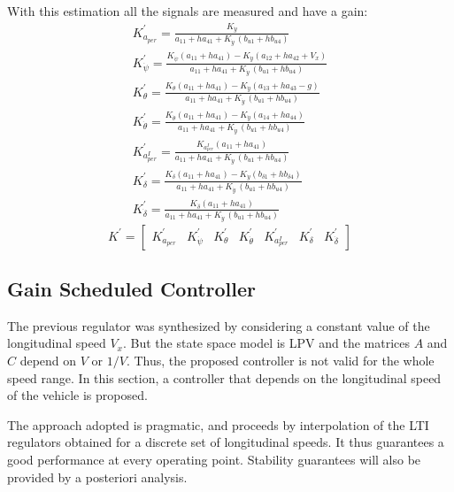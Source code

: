 With this estimation all the signals are measured and have a gain:
\begin{eqnarray}
K_{a_{per}}^{'}=\frac{K_{\dot{y}}}{a_{11}+ha_{41}+K_{\dot{y}}\,(b_{u1}+hb_{u4})} \\[10pt]
K_{\dot{\psi}}^{'}=\frac{K_{\dot{\psi}}(a_{11}+ha_{41})-K_{\dot{y}}(a_{12}+ha_{42}+V_{x})}{a_{11}+ha_{41}+K_{\dot{y}}\,(b_{u1}+hb_{u4})} \\[10pt]
K_{\theta}^{'}=\frac{K_{\theta}(a_{11}+ha_{41})-K_{\dot{y}}(a_{13}+ha_{43}-g)}{a_{11}+ha_{41}+K_{\dot{y}}\,(b_{u1}+hb_{u4})} \\[10pt]
K_{\dot{\theta}}^{'}=\frac{K_{\dot{\theta}}(a_{11}+ha_{41})-K_{\dot{y}}(a_{14}+ha_{44})}{a_{11}+ha_{41}+K_{\dot{y}}\,(b_{u1}+hb_{u4})} \\[10pt]
K_{a_{per}^{I}}^{'}=\frac{K_{a_{per}^{I}}(a_{11}+ha_{41})}{a_{11}+ha_{41}+K_{\dot{y}}\,(b_{u1}+hb_{u4})} \\[10pt]
K_{\delta}^{'}=\frac{K_{\delta}(a_{11}+ha_{41})-K_{\dot{y}}(b_{\delta 1}+hb_{\delta 4})}{a_{11}+ha_{41}+K_{\dot{y}}\,(b_{u1}+hb_{u4})} \\[10pt]
K_{\dot{\delta}}^{'}=\frac{K_{\dot{\delta}}(a_{11}+ha_{41})}{a_{11}+ha_{41}+K_{\dot{y}}\,(b_{u1}+hb_{u4})}
\end{eqnarray}
\[K^{'}=\begin{bmatrix}
K_{a_{per}}^{'} & K_{\dot{\psi}}^{'} & K_{\theta}^{'} & K_{\dot{\theta}}^{'} & K_{a_{per}^{I}}^{'} & K_{\delta}^{'} & K_{\dot{\delta}}^{'}
\end{bmatrix} \]
\newpage
\subsection{Gain Scheduled Controller}
The previous regulator was synthesized by considering a constant value of the longitudinal speed $V_{x}$. But the state space model is LPV and the matrices $A$ and $C$ depend on $V$ or $1/V$. Thus, the proposed controller is not valid for the whole speed range. In this section, a controller that depends on the longitudinal speed of the vehicle is proposed. 

The approach adopted is pragmatic, and proceeds by interpolation of the LTI regulators obtained for a discrete set of longitudinal speeds. It thus guarantees a good performance at every operating point. Stability guarantees will also be provided by a posteriori analysis. 

